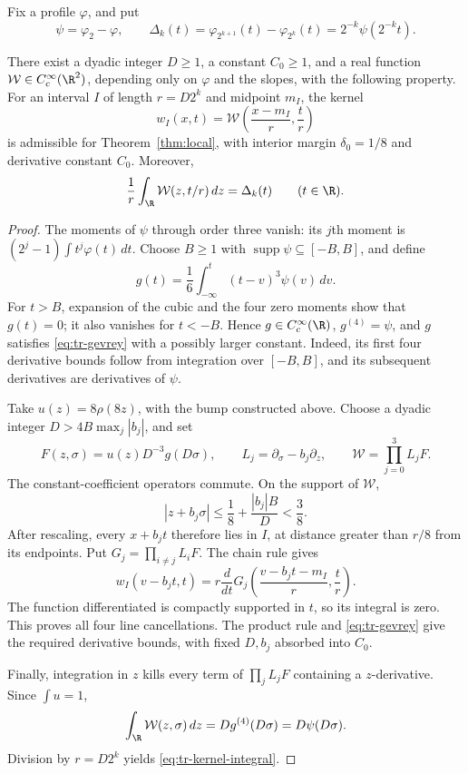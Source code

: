 Fix a profile \(\varphi\), and put
\begin{equation}
 \psi=\varphi_2-\varphi,
 \qquad
 \Delta_k(t)=\varphi_{2^{k+1}}(t)-\varphi_{2^k}(t)
            =2^{-k}\psi(2^{-k}t).
 \label{eq:tr-difference}
\end{equation}

\begin{lemma}
\label{lem:tr-kernel}
There exist a dyadic integer \(D\geq1\), a constant \(C_0\geq1\),
and a real function \(\mathcal W\in C_c^\infty(\R^2)\), depending
only on \(\varphi\) and the slopes, with the following property.
For an interval \(I\) of length \(r=D2^k\) and midpoint \(m_I\),
the kernel
\[
 w_I(x,t)=\mathcal W\left(\frac{x-m_I}{r},\frac{t}{r}\right)
\]
is admissible for Theorem~\ref{thm:local}, with interior margin
\(\delta_0=1/8\) and derivative constant \(C_0\).  Moreover,
\begin{equation}
 \frac1r\int_\R\mathcal W(z,t/r)\,dz=\Delta_k(t)
 \qquad(t\in\R).
 \label{eq:tr-kernel-integral}
\end{equation}
\end{lemma}

\begin{proof}
The moments of \(\psi\) through order three vanish: its \(j\)th
moment is \((2^j-1)\int t^j\varphi(t)\,dt\).  Choose \(B\geq1\)
with \(\operatorname{supp}\psi\subseteq[-B,B]\), and define
\[
 g(t)=\frac16\int_{-\infty}^t(t-v)^3\psi(v)\,dv.
\]
For \(t>B\), expansion of the cubic and the four zero moments show
that \(g(t)=0\); it also vanishes for \(t<-B\).  Hence
\(g\in C_c^\infty(\R)\), \(g^{(4)}=\psi\), and \(g\) satisfies
\eqref{eq:tr-gevrey} with a possibly larger constant.  Indeed, its
first four derivative bounds follow from integration over \([-B,B]\),
and its subsequent derivatives are derivatives of \(\psi\).

Take \(u(z)=8\rho(8z)\), with the bump constructed above.  Choose a
dyadic integer \(D>4B\max_j|b_j|\), and set
\[
 F(z,\sigma)=u(z)D^{-3}g(D\sigma),\qquad
 L_j=\partial_\sigma-b_j\partial_z,\qquad
 \mathcal W=\prod_{j=0}^3L_jF.
\]
The constant-coefficient operators commute.  On the support of
\(\mathcal W\),
\[
 |z+b_j\sigma|\leq\frac18+\frac{|b_j|B}{D}<\frac38.
\]
After rescaling, every \(x+b_jt\) therefore lies in \(I\), at distance
greater than \(r/8\) from its endpoints.  Put
\(G_j=\prod_{i\ne j}L_iF\).  The chain rule gives
\[
 w_I(v-b_jt,t)
 =r\frac{d}{dt}
   G_j\left(\frac{v-b_jt-m_I}{r},\frac{t}{r}\right).
\]
The function differentiated is compactly supported in \(t\), so its
integral is zero.  This proves all four line cancellations.  The product
rule and \eqref{eq:tr-gevrey} give the required derivative bounds,
with fixed \(D,b_j\) absorbed into \(C_0\).

Finally, integration in \(z\) kills every term of \(\prod_jL_jF\)
containing a \(z\)-derivative.  Since \(\int u=1\),
\[
 \int_\R\mathcal W(z,\sigma)\,dz=Dg^{(4)}(D\sigma)=D\psi(D\sigma).
\]
Division by \(r=D2^k\) yields \eqref{eq:tr-kernel-integral}.
\end{proof}

